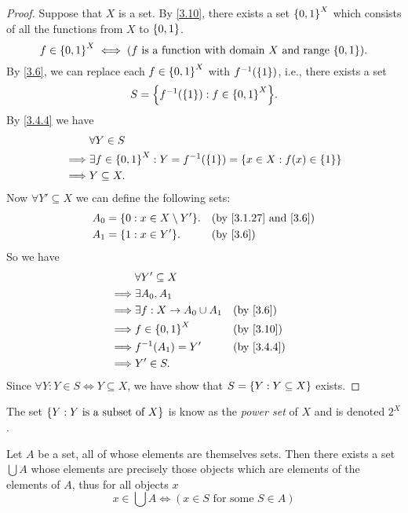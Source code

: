 \begin{proof}
  Suppose that \(X\) is a set.
  By \cref{3.10}, there exists a set \(\left\lbrace0, 1\right\rbrace^X\) which consists of all the functions from \(X\) to \(\left\lbrace0, 1\right\rbrace\).
  \[
    f \in \set{0, 1}^X \iff (f \text{ is a function with domain } X \text{ and range } \set{0, 1}).
  \]
  By \cref{3.6}, we can replace each \(f \in \left\lbrace0, 1\right\rbrace^X\) with \(f^{-1}(\left\lbrace1\right\rbrace)\), i.e., there exists a set
  \[
    S = \set{f^{-1}(\set{1}) : f \in \set{0, 1}^X}.
  \]
  By \cref{3.4.4} we have
  \begin{align*}
             & \forall Y \in S                                                                     \\
    \implies & \exists f \in \left\lbrace0, 1\right\rbrace^X : Y = f^{-1}(\left\lbrace1\right\rbrace) = \left\lbrace x \in X : f(x) \in \left\lbrace1\right\rbrace\right\rbrace \\
    \implies & Y \subseteq X.
  \end{align*}
  Now \(\forall Y' \subseteq X\) we can define the following sets:
  \begin{align*}
    A_0 & = \set{0 : x \in X \setminus Y'}. &  & \text{(by \cref{3.1.27} and \cref{3.6})} \\
    A_1 & = \set{1 : x \in Y'}.             &  & \text{(by \cref{3.6})}
  \end{align*}
  So we have
  \begin{align*}
             & \forall Y' \subseteq X                                      \\
    \implies & \exists A_0, A_1                                            \\
    \implies & \exists f : X \to A_0 \cup A_1 &  & \text{(by \cref{3.6})}  \\
    \implies & f \in \set{0, 1}^X             &  & \text{(by \cref{3.10})} \\
    \implies & f^{-1}(A_1) = Y'               &  & \by{3.4.4}              \\
    \implies & Y' \in S.
  \end{align*}
  Since \(\forall Y : Y \in S \iff Y \subseteq X\), we have show that \(S = \left\lbrace Y : Y \subseteq X\right\rbrace\) exists.
\end{proof}

\begin{rmk}\label{3.4.10}
  The set \(\left\lbrace Y : Y \text{ is a subset of } X\right\rbrace\) is know as the \emph{power set} of \(X\) and is denoted \(2^X\).
\end{rmk}

\begin{ax}[Union]\label{3.11}
  Let \(A\) be a set, all of whose elements are themselves sets.
  Then there exists a set \(\bigcup A\) whose elements are precisely those objects which are elements of the elements of \(A\), thus for all objects \(x\)
  \[
    x \in \bigcup A \iff (x \in S \text{ for some } S \in A)
  \]
\end{ax}


